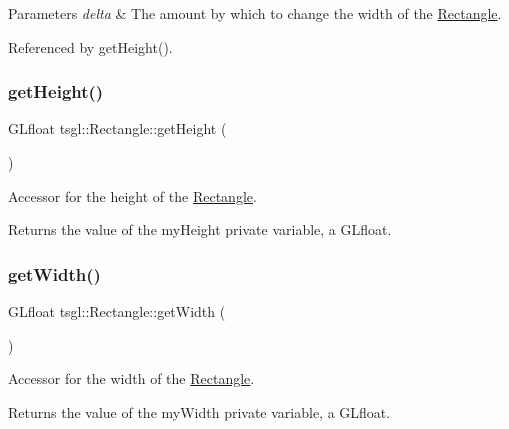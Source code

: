 \begin{DoxyParams}{Parameters}
{\em delta} & The amount by which to change the width of the \hyperlink{classtsgl_1_1_rectangle}{Rectangle}. \\
\hline
\end{DoxyParams}


Referenced by get\+Height().

\mbox{\label{classtsgl_1_1_rectangle_a17d9e87c9fc9a465e9b48eec226eb62e}} 
\subsubsection{\texorpdfstring{get\+Height()}{getHeight()}}
{\footnotesize\ttfamily G\+Lfloat tsgl\+::\+Rectangle\+::get\+Height (\begin{DoxyParamCaption}{ }\end{DoxyParamCaption})\hspace{0.3cm}{\ttfamily [inline]}}



Accessor for the height of the \hyperlink{classtsgl_1_1_rectangle}{Rectangle}. 

Returns the value of the my\+Height private variable, a G\+Lfloat. \mbox{\label{classtsgl_1_1_rectangle_ae2139384b6ceeab89c4297ed80835011}} 
\subsubsection{\texorpdfstring{get\+Width()}{getWidth()}}
{\footnotesize\ttfamily G\+Lfloat tsgl\+::\+Rectangle\+::get\+Width (\begin{DoxyParamCaption}{ }\end{DoxyParamCaption})\hspace{0.3cm}{\ttfamily [inline]}}



Accessor for the width of the \hyperlink{classtsgl_1_1_rectangle}{Rectangle}. 

Returns the value of the my\+Width private variable, a G\+Lfloat. \mbox{\label{classtsgl_1_1_rectangle_aa875690bd21ba3a9ca373d38807ccbdc}} 

